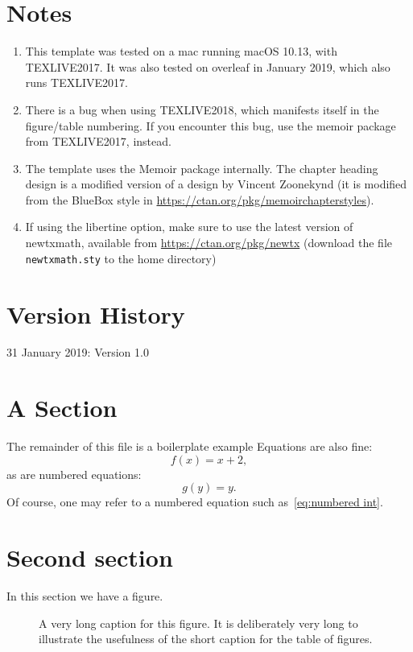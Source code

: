 \section{Notes}
\begin{enumerate}
    \item This template was tested on a mac running macOS 10.13, with TEXLIVE2017. It was also tested on overleaf in January 2019, which also runs TEXLIVE2017. 
    \item There is a bug when using TEXLIVE2018, which manifests itself in the figure/table numbering. If you encounter this bug, use the memoir package from
          TEXLIVE2017, instead. 
    \item The template uses the Memoir package internally. The chapter heading design is a modified version of a design by Vincent Zoonekynd 
        (it is modified from the BlueBox style in \url{https://ctan.org/pkg/memoirchapterstyles}).  
       \item If using the libertine option, make sure to use the latest version of newtxmath, available from \url{https://ctan.org/pkg/newtx}
   (download the file \verb"newtxmath.sty" to the home directory)
   \end{enumerate}


   \section{ Version History}
31 January 2019:    Version 1.0




\section{A Section} 
The remainder of this file is a boilerplate example
Equations are also fine: 
\[ 
    f(x) = x+2,
\] 
as are numbered equations:
\begin{equation}\label{eq:numbered int}
    g(y) = y.
\end{equation}
Of course, one may refer to a numbered equation such as~\eqref{eq:numbered int}. 

\section{Second section}
In this section we have a figure. 

\begin{figure}[t]
    \begin{center}
\end{center}
\caption[Short caption]{A very long caption for this figure. It is deliberately very long to illustrate the usefulness of the short caption for the table of figures. }
\label{fig:rectangle}
\end{figure}
\lipsum[10-13]















